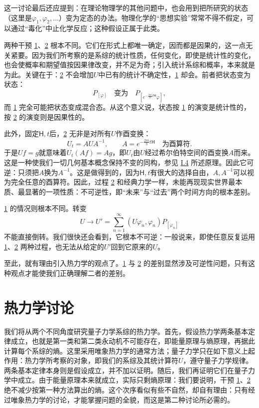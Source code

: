 \documentclass[fontsize=13pt,twoside,openany,headings=normal,parskip=false,bookmarkpackage=false,DIV=calc]{scrbook}
\begin{document}
这一讨论最后还应提到：在理论物理学的其他问题中，也会用到把所研究的状态（这里是$\varphi_1,\allowbreak \varphi_2,\allowbreak \ldots$）变为定态的办法。物理化学的“思想实验”常常不得不假定，可以通过“毒化”中止化学反应；这种假设正属于此类。

两种干预 \hyperref[eq:V.1.1]{1}、\hyperref[eq:V.1.2]{2} 根本不同。它们在形式上都唯一确定，因而都是因果的，这一点无关紧要。因为我们所考察的是系综的统计性质，任何变化，即使是统计性的变化，也会使概率和期望值按因果律改变，并不足为奇；引入统计系综和概率，本来就是为此。关键在于：\hyperref[eq:V.1.2]{2} 不会增加$U$中已有的统计不确定性，\hyperref[eq:V.1.1]{1} 却会。前者把状态变为状态：
\[
P_{[\varphi]}\quad\text{变为}\quad P_{[e^{-\frac{2\pi i}{h}t\mathsf{H}}\varphi]},
\]
而 \hyperref[eq:V.1.1]{1} 完全可能把状态变成混合态。从这个意义说，状态按 \hyperref[eq:V.1.1]{1} 的演变是统计性的，按 \hyperref[eq:V.1.2]{2} 的演变则是因果性的。

此外，固定$\mathsf{H},\allowbreak t$后，\hyperref[eq:V.1.2]{2} 无非是对所有$U$作酉变换：
\[
U_t=AUA^{-1},\qquad A=e^{-\frac{2\pi i}{h}t\mathsf{H}}\quad\text{为酉算符}.
\]
于是$Uf=g$就意味着$U_t(Af)=Ag$，即$U_t$由$U$经过希尔伯特空间的酉变换$A$而来。这是一种使我们一切几何基本概念保持不变的同构，参见 \hyperref[sec:I.4]{I.4} 所述原理。因此它可逆：只须把$A$换为$A^{-1}$。这是做得到的，因为$\mathsf{H},\allowbreak t$有很大的选择自由，$A,\allowbreak A^{-1}$可以视为完全任意的酉算符。因此，过程 \hyperref[eq:V.1.2]{2} 和经典\hypertarget{origpage-191}{}\label{origpage-191}力学一样，未能再现现实世界最本质、最显著的一项性质：不可逆性，即“未来”与“过去”两个时间方向的根本差别。

\hyperref[eq:V.1.1]{1} 的情况则根本不同。转变
\[
U\longrightarrow U'=\sum_{n=1}^{\infty}(U\varphi_n,\varphi_n)P_{[\varphi_n]}
\]
不能直接倒转。我们很快还会看到，它根本不可逆：一般说来，即使任意反复运用 \hyperref[eq:V.1.1]{1}、\hyperref[eq:V.1.2]{2} 两种过程，也无法从给定的$U'$回到它原来的$U$。

至此，就有理由引入热力学的观点了。\hyperref[eq:V.1.1]{1} 与 \hyperref[eq:V.1.2]{2} 的差别显然涉及可逆性问题，只有这种观点才能使我们正确理解二者的差别。

\section{热力学讨论}\label{sec:V.2}
我们将从两个不同角度研究量子力学系综的热力学。首先，假设热力学两条基本定律成立，也就是第一类和第二类永动机不可能存在，即能量原理与熵原理，再据此计算每个系综的熵。这里采用唯象热力学的通常方法；量子力学只在如下意义上起作用：热力学所考察的对象，即我们的系综及其统计算符$U$，遵守量子力学规律。两条基本定律本身则是假设成立，并不加以证明。随后，我们再证明它们在量子力学中成立。由于能量原理本来就成立，实际只剩熵原理：我们要说明，干预 \hyperref[eq:V.1.1]{1}、\hyperref[eq:V.1.2]{2} 绝不减少按第一种方法算出的熵。这个次序看似有些不自然，却自有理由：只有经过唯象热力学的讨论，才能掌握问题的全貌，而这是第二种讨论所必需的。
\end{document}
